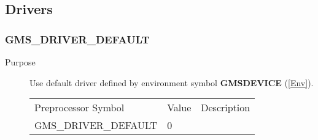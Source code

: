 \newpage



\subsection{Drivers\label{DRefpages}}

\subsubsection{GMS\_DRIVER\_DEFAULT\label{default}}
\begin{description}
\item[Purpose]\mbox{}


Use default driver defined by
environment symbol  
{\bf GMSDEVICE} (\ref{Env}).
\begin{center}
\begin{tabular}{lll}\hline
Preprocessor Symbol & Value& Description\\ 
GMS\_DRIVER\_DEFAULT & 0 & \\ 
\hline\end{tabular}
\end{center}
\end{description}


\newpage



